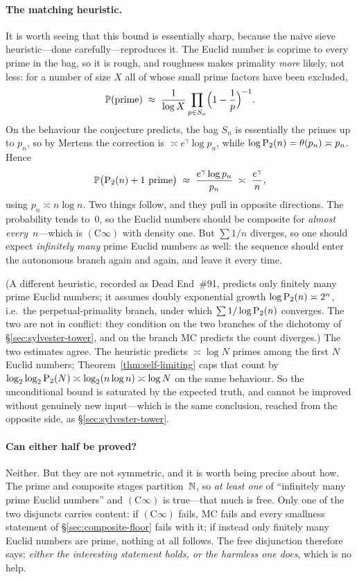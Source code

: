 \paragraph{The matching heuristic.}
It is worth seeing that this bound is essentially sharp, because the
naive sieve heuristic---done carefully---reproduces it.  The Euclid
number is coprime to every prime in the bag, so it is rough, and
roughness makes primality \emph{more} likely, not less: for a number of
size $X$ all of whose small prime factors have been excluded,
\[
  \mathbb{P}(\text{prime})
  \;\approx\;
  \frac{1}{\log X}\prod_{p \in S_n}\Bigl(1-\frac1p\Bigr)^{-1}.
\]
On the behaviour the conjecture predicts, the bag $S_n$ is essentially
the primes up to $p_n$, so by Mertens the correction is
$\asymp e^{\gamma}\log p_n$, while $\log \mathrm{P}_{2}(n) = \theta(p_n) \asymp p_n$.
Hence
\[
  \mathbb{P}\bigl(\mathrm{P}_{2}(n)+1 \text{ prime}\bigr)
  \;\approx\; \frac{e^{\gamma}\log p_n}{p_n}
  \;\asymp\; \frac{e^{\gamma}}{n},
\]
using $p_n \asymp n\log n$.  Two things follow, and they pull in
opposite directions.  The probability tends to~$0$, so the Euclid numbers
should be composite for \emph{almost every}~$n$---which is
$(\mathrm{C}\infty)$ with density one.  But $\sum 1/n$ diverges, so one
should expect \emph{infinitely many} prime Euclid numbers as well: the
sequence should enter the autonomous branch again and again, and leave it
every time.

(A different heuristic, recorded as Dead End~\#91, predicts only finitely
many prime Euclid numbers; it assumes doubly exponential growth
$\log \mathrm{P}_{2}(n) \asymp 2^{n}$, i.e.\ the perpetual-primality branch,
under which $\sum 1/\log\mathrm{P}_{2}(n)$ converges.  The two are not in
conflict: they condition on the two branches of the dichotomy of
\S\ref{sec:sylvester-tower}, and on the branch MC predicts the count
diverges.)  The two estimates agree.  The heuristic predicts $\asymp \log N$ primes
among the first $N$ Euclid numbers; Theorem~\ref{thm:self-limiting} caps
that count by $\log_2\log_2 \mathrm{P}_{2}(N) \asymp \log_2(n \log n) \asymp
\log N$ on the same behaviour.  So the unconditional bound is saturated
by the expected truth, and cannot be improved without genuinely new
input---which is the same conclusion, reached from the opposite side, as
\S\ref{sec:sylvester-tower}.

\paragraph{Can either half be proved?}
Neither.  But they are not symmetric, and it is worth being precise about
how.  The prime and composite stages partition~$\mathbb{N}$, so
\emph{at least one} of ``infinitely many prime Euclid numbers'' and
$(\mathrm{C}\infty)$ is true---that much is free.  Only one of the two
disjuncts carries content: if $(\mathrm{C}\infty)$ fails, MC fails and
every smallness statement of \S\ref{sec:composite-floor} fails with it; if instead only
finitely many Euclid numbers are prime, nothing at all follows.  The
free disjunction therefore says: \emph{either the interesting statement
holds, or the harmless one does}, which is no help.

